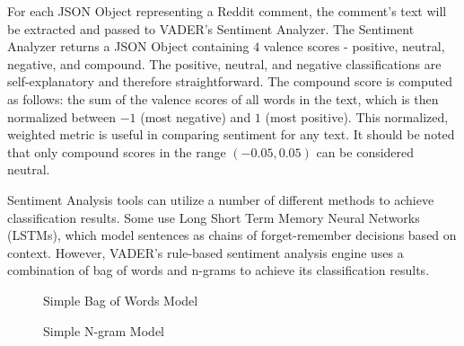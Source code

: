 \documentclass[letterpaper]{article}
\begin{document}
For each JSON Object representing a Reddit comment, the comment's text will be extracted and passed to VADER's Sentiment Analyzer. The Sentiment Analyzer returns a JSON Object containing $4$ valence scores - positive, neutral, negative, and compound. The positive, neutral, and negative classifications are self-explanatory and therefore straightforward. The compound score is computed as follows: the sum of the valence scores of all words in the text, which is then normalized between $-1$ (most negative) and $1$ (most positive). This normalized, weighted metric is useful in comparing sentiment for any text. It should be noted that only compound scores in the range $(-0.05, 0.05)$ can be considered neutral.

Sentiment Analysis tools can utilize a number of different methods to achieve classification results. Some use Long Short Term Memory Neural Networks (LSTMs), which model sentences as chains of forget-remember decisions based on context. However, VADER's rule-based sentiment analysis engine uses a combination of bag of words and n-grams to achieve its classification results.

\begin{figure}[htbp]
\begin{minipage}[t]{0.45\linewidth}
    \caption{Simple Bag of Words Model}
    \label{f1}
\end{minipage}%
    \hfill%
\begin{minipage}[t]{0.45\linewidth}
    \caption{Simple N-gram Model}
    \label{f2}
\end{minipage} 
\end{figure}
\end{document}
